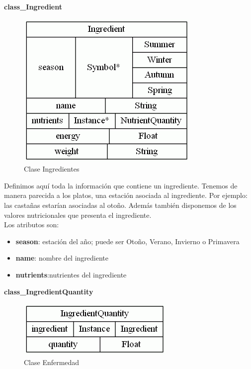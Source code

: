 \documentclass[12]{article}
\begin{document}
\vspace{0.5cm}

\textbf{class\_Ingredient}
\begin{figure}[H]
\centering
\includegraphics[scale=0.5]{images/classIngredient.png}
\caption{Clase Ingredientes}
\label{ingredientes}
\end{figure}

Definimos aquí toda la información que contiene un ingrediente. Tenemos de manera parecida a los platos, una estación asociada al ingrediente. Por ejemplo: las castañas estarían asociadas al otoño. Además también disponemos de los valores nutricionales que presenta el ingrediente.
\\

Los atributos son: 

\begin{itemize}
\item \textbf{season}: estación del año; puede ser Otoño, Verano, Invierno o Primavera
\item \textbf{name}: nombre del ingrediente
\item \textbf{nutrients}:nutrientes del ingrediente
\end{itemize}


\vspace{0.5cm}

\textbf{class\_IngredientQuantity}
\begin{figure}[H]
\centering
\includegraphics[scale=0.5]{images/classIngredientQuantity.png}
\caption{Clase Enfermedad}
\label{cantidad_ingrediente}
\end{figure}
\end{document}
